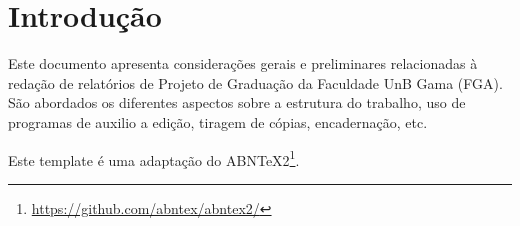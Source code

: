 \chapter[Introdução]{Introdução}

Este documento apresenta considerações gerais e preliminares relacionadas
à redação de relatórios de Projeto de Graduação da Faculdade UnB Gama
(FGA). São abordados os diferentes aspectos sobre a estrutura do trabalho,
uso de programas de auxilio a edição, tiragem de cópias, encadernação, etc.

Este template é uma adaptação do ABNTeX2\footnote{\url{https://github.com/abntex/abntex2/}}.
